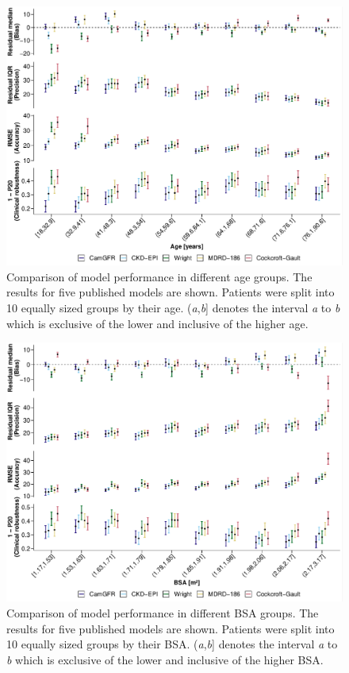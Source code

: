 \documentclass[11pt,]{article}
\begin{document}
\begin{figure}
\centering
\includegraphics{1_Validation_nonIDMS_files/figure-latex/PLOT_performance_age-1.pdf}
\caption{\label{fig:performace_age}Comparison of model performance in
different age groups. The results for five published models are shown.
Patients were split into 10 equally sized groups by their age.
(\emph{a},\emph{b}{]} denotes the interval \emph{a} to \emph{b} which is
exclusive of the lower and inclusive of the higher age.}
\end{figure}

\begin{figure}
\centering
\includegraphics{1_Validation_nonIDMS_files/figure-latex/PLOT_performance_BSA-1.pdf}
\caption{\label{fig:performace_BSA}Comparison of model performance in
different BSA groups. The results for five published models are shown.
Patients were split into 10 equally sized groups by their BSA.
(\emph{a},\emph{b}{]} denotes the interval \emph{a} to \emph{b} which is
exclusive of the lower and inclusive of the higher BSA.}
\end{figure}
\end{document}
